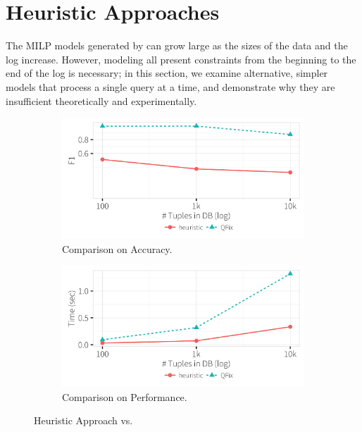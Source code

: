 
\appendix

\section{Heuristic Approaches}
\label{sec:heuristic}
% 
The MILP models generated by \sys can grow large as the sizes of the
data and the log increase. However, modeling all present constraints
from the beginning to the end of the log is necessary; in this
section, we examine alternative, simpler models that process a single
query at a time, and demonstrate why they are insufficient 
theoretically and experimentally.
  \begin{figure}[t]
  \centering
  \begin{subfigure} [t]{.3\textwidth}
    \includegraphics[width = .99\columnwidth]{figures/heuristicacc}
    \vspace*{-.25in}
    \caption{Comparison on Accuracy. }
    \vspace*{-.1in}
    \label{f:heuristic_acc} 
    \end{subfigure}
      \begin{subfigure} [t]{.3\textwidth}
    \includegraphics[width = .99\columnwidth]{figures/heuristictime}
    \vspace*{-.25in}
    \caption{Comparison on Performance. }
    \vspace*{-.1in}
    \label{f:heuristic_time} 
    \end{subfigure}
   \caption{Heuristic Approach vs. \sys}
   \vspace*{-.1in}
  \end{figure}
  
